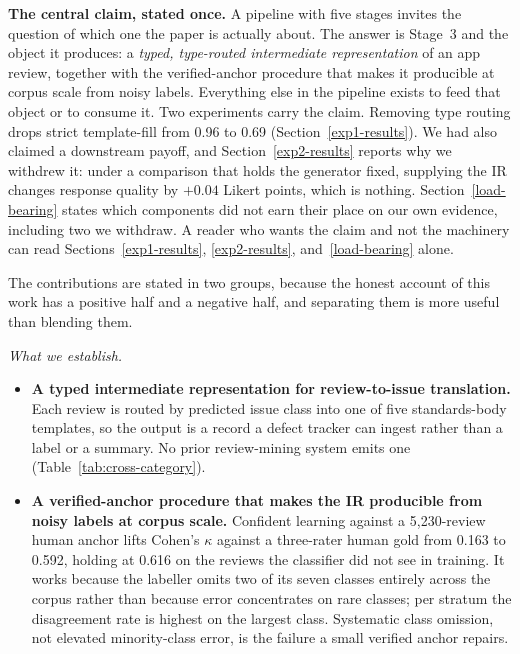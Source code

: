 \documentclass[preprint,12pt]{elsarticle}
\begin{document}
\textbf{The central claim, stated once.} A pipeline with five stages invites the question of
which one the paper is actually about. The answer is Stage~3 and the object it produces: a
\emph{typed, type-routed intermediate representation} of an app review, together with the
verified-anchor procedure that makes it producible at corpus scale from noisy labels. Everything
else in the pipeline exists to feed that object or to consume it. Two experiments carry the
claim. Removing type routing drops strict template-fill from 0.96 to 0.69
(Section~\ref{exp1-results}). We had also claimed a downstream payoff, and Section~\ref{exp2-results}
reports why we withdrew it: under a comparison that holds the generator fixed, supplying the IR
changes response quality by $+0.04$ Likert points, which is nothing. Section~\ref{load-bearing} states which components did
not earn their place on our own evidence, including two we withdraw. A reader who wants the
claim and not the machinery can read Sections~\ref{exp1-results}, \ref{exp2-results},
and~\ref{load-bearing} alone.

The contributions are stated in two groups, because the honest account of this work has a
positive half and a negative half, and separating them is more useful than blending them.

\emph{What we establish.}
\begin{itemize}\setlength{\itemsep}{2pt}
  \item \textbf{A typed intermediate representation for review-to-issue translation.} Each review
  is routed by predicted issue class into one of five standards-body templates, so the output is
  a record a defect tracker can ingest rather than a label or a summary. No prior review-mining
  system emits one (Table~\ref{tab:cross-category}).
  \item \textbf{A verified-anchor procedure that makes the IR producible from noisy labels at
  corpus scale.} Confident learning against a 5{,}230-review human anchor lifts Cohen's $\kappa$
  against a three-rater human gold from 0.163 to 0.592, holding at 0.616 on the reviews the
  classifier did not see in training. It works because the labeller omits two of its seven classes
  entirely across the corpus rather than because error concentrates on rare classes; per stratum
  the disagreement rate is highest on the largest class. Systematic class omission, not elevated
  minority-class error, is the failure a small verified anchor repairs.
\end{itemize}
\end{document}
